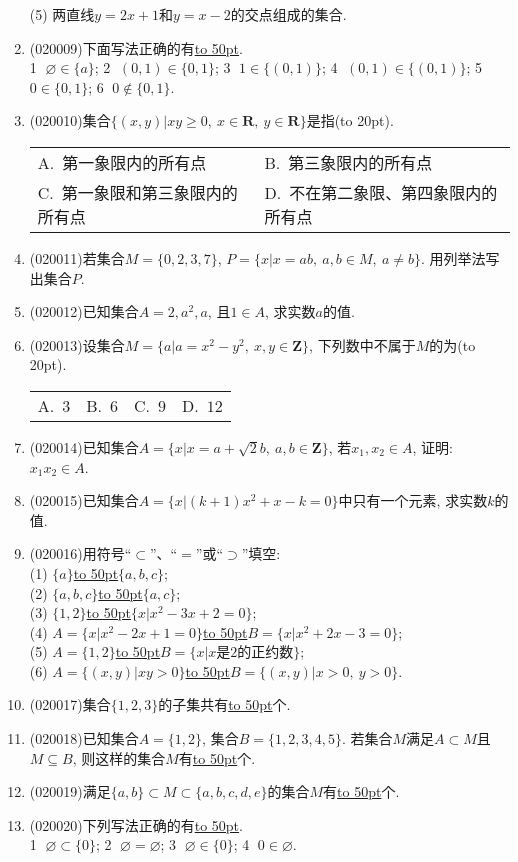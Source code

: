 \documentclass[10pt,a4paper]{article}
\newcommand{\blank}[1]{\underline{\hbox to #1pt{}}}
\newcommand{\bracket}[1]{(\hbox to #1pt{})}
\newcommand{\twoch}[4]{\par\begin{tabular}{p{.46\textwidth}p{.46\textwidth}}
A.~#1& B.~#2\\
C.~#3& D.~#4
\end{tabular}}
\newcommand{\fourch}[4]{\par\begin{tabular}{p{.23\textwidth}p{.23\textwidth}p{.23\textwidth}p{.23\textwidth}}
A.~#1 &B.~#2& C.~#3& D.~#4
\end{tabular}}
\begin{document}
\begin{enumerate}[1.]
(5) 两直线$y=2x+1$和$y=x-2$的交点组成的集合.
\item {\tiny (020009)}下面写法正确的有\blank{50}.\\
\textcircled{1} $\varnothing\in\{a\}$; \textcircled{2} $(0, 1)\in\{0, 1\}$; \textcircled{3} $1 \in \{(0,1)\}$; \textcircled{4} $(0,1) \in \{(0,1)\}$; \textcircled{5} $0\in \{0,1\}$; \textcircled{6} $0 \notin \{0,1\}$.
\item {\tiny (020010)}集合$\{(x, y)|xy\ge 0,\  x\in\mathbf{R},\  y\in\mathbf{R}\}$是指\bracket{20}.
\twoch{第一象限内的所有点}{第三象限内的所有点}{第一象限和第三象限内的所有点}{不在第二象限、第四象限内的所有点}
\item {\tiny (020011)}若集合$M=\{0,2,3,7\}$, $P=\{x|x=ab,\ a,b\in M, \ a\ne b\}$. 用列举法写出集合$P$.
\item {\tiny (020012)}已知集合$A={2, a^2, a}$, 且$1\in A$, 求实数$a$的值.
\item {\tiny (020013)}设集合$M=\{a|a=x^2-y^2, \ x,y\in\mathbf{Z}\}$, 下列数中不属于$M$的为\bracket{20}.
\fourch{$3$}{$6$}{$9$}{$12$}
\item {\tiny (020014)}已知集合$A=\{x|x=a+\sqrt 2b,\ a,b\in \mathbf{Z}\}$, 若$x_1,x_2\in A$, 证明: $x_1x_2\in A$.
\item {\tiny (020015)}已知集合$A=\{x|(k+1)x^2+x-k=0\}$中只有一个元素, 求实数$k$的值.
\item {\tiny (020016)}用符号``$\subset$''、``$=$''或``$\supset$''填空:\\
(1) $\{a\}$\blank{50}$\{a, b, c\}$;\\
(2) $\{a, b, c\}$\blank{50}$\{a, c\}$;\\
(3) $\{1, 2\}$\blank{50}$\{x|x^2-3x+2=0\}$;\\
(4) $A=\{x|x^2-2x+1=0\}$\blank{50}$B=\{x|x^2+2x-3=0\}$;\\
(5) $A=\{1, 2\}$\blank{50}$B=\{x|x$是$2$的正约数$\}$;\\
(6) $A=\{(x, y)|xy>0\}$\blank{50}$B=\{(x, y)|x>0, \ y>0\}$.
\item {\tiny (020017)}集合$\{1,2,3\}$的子集共有\blank{50}个.
\item {\tiny (020018)}已知集合$A=\{1,2\}$, 集合$B=\{1,2,3,4,5\}$. 若集合$M$满足$A\subset M$且$M\subseteq B$, 则这样的集合$M$有\blank{50}个.
\item {\tiny (020019)}满足$\{a, b\}\subset M \subset\{a, b, c, d, e\}$的集合$M$有\blank{50}个.
\item {\tiny (020020)}下列写法正确的有\blank{50}.\\
\textcircled{1} $\varnothing\subset\{0\}$; \textcircled{2} $\varnothing=\varnothing$; \textcircled{3} $\varnothing\in\{0\}$; \textcircled{4} $0\in\varnothing$.

\end{enumerate}
\end{document}
